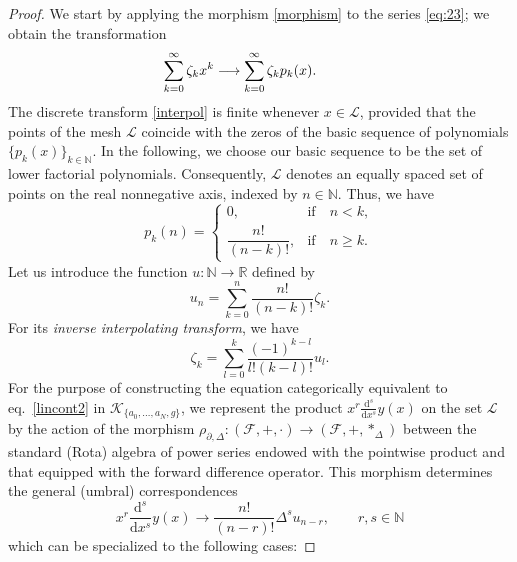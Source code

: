 \documentclass[10pt]{amsart}
\numberwithin{equation}{section}
\theoremstyle{definition}
\begin{document}
\begin{proof}
We start by applying the morphism  \eqref{morphism} to the series  \eqref{eq:23}; we obtain the transformation
\begin{equation}
\sum _{k=0}^{\infty} \zeta _{k} x^{k} \longrightarrow \sum _{k=0}^{
\infty} \zeta _{k} p_{k} (x).
\hspace{10mm}
\label{interpol}
\end{equation}
The discrete transform \eqref{interpol} is finite whenever
$x\in \mathcal{L}$, provided that the points of the mesh
$\mathcal{L}$ coincide with the zeros of the basic sequence of polynomials
$\{p_{k}(x)\}_{k\in \mathbb{N}}$. In the following, we choose our basic
sequence to be the set of lower factorial polynomials. Consequently,
$\mathcal{L}$ denotes an equally spaced set of points on the real nonnegative
axis, indexed by $n\in \mathbb{N}$. Thus, we have
\begin{equation}
p_{k}(n)=
\begin{cases}
0, & \mathrm{if} \quad n<k,
\\[5pt]
\dfrac{n!}{(n-k)!}, & \mathrm{if}\quad n \geq k.
\label{pol}
\end{cases}
\end{equation}
 Let us introduce the function $u:\mathbb{N}\rightarrow \mathbb{R}$ defined
by
\begin{equation}
\label{eq:3.9}
u_{n}= \sum _{k=0}^{n} \frac{n!}{(n-k)!} \zeta _{k}.
\end{equation}
For its \textit{inverse interpolating transform}, we have
\begin{equation}
\label{invtr}
\zeta _{k}= \sum _{l=0}^{k}\frac{ (-1)^{k-l} }{ l!(k-l)!}u_{l}.
\end{equation}
For the purpose of constructing the equation categorically equivalent to
eq.~\eqref{lincont2} in $\mathcal{K}_{\{ a_{0},\ldots , a_{N},g\}}$, we
represent the product
$x^{r}\frac{\mathrm{d}^{s}}{\mathrm{d}x^{s}}y(x)$ on the set
$\mathcal{L}$ by the action of the morphism
$\rho _{\partial ,\Delta}: (\mathcal{F},+,\cdot )\rightarrow (
\mathcal{F},+,*_{\Delta})$ between the standard (Rota) algebra of power
series endowed with the pointwise product and that equipped with the forward
difference operator. This morphism determines the general (umbral) correspondences
\begin{equation}
x^{r}\frac{\mathrm{d}^{s}}{\mathrm{d}x^{s}}y(x)\longrightarrow
\frac{n!}{(n-r)!}\Delta ^{s} u_{n-r}, \qquad r,s\in \mathbb{N}
\label{eq5.11}
\end{equation}
which can be specialized to the following cases:

\end{proof}
\end{document}
